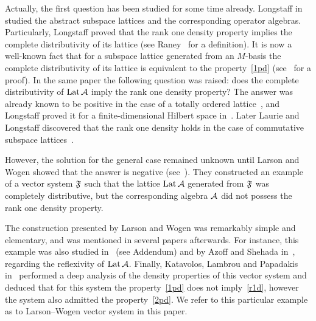 \documentclass[12pt,oneside,a4paper]{amsart}
\begin{document}
  Actually, the first question has been studied for some time already.
  Long\-staff in~\cite{longstaff} studied the abstract subspace lattices and the corresponding operator algebras.
  Particularly, Longstaff proved that the rank one density property implies
    the complete distributivity of its lattice (see Raney~\cite{raney} for a definition).
  It is now a well-known fact that for a subspace lattice generated from an $M$-basis the complete distributivity of its lattice is equivalent to
    the property~\eqref{1pd} (see~\cite{argyroslambrou} for a proof).
  In the same paper the following question was raised: does the complete distributivity of $\lattice$ imply the rank one density property?
  The answer was already known to be positive in the case of a totally ordered lattice~\cite{erdos}, and
    Longstaff proved it for a finite-dimensional Hilbert space in~\cite{longstaff}.
  Later Laurie and Longstaff discovered that the rank one density holds in the case of commutative subspace lattices~\cite{laurielongstaff}.

  However, the solution for the general case remained unknown until Larson and Wogen showed that the answer is negative (see~\cite{larson}).
  They constructed an example of a vector system $\fsys$ such that the lattice $\lattice$ generated from $\fsys$
    was completely distributive, but the corresponding algebra $\cal{A}$
    did not possess the rank one density property.
  The construction presented by Larson and Wogen was remarkably simple and elementary, and was mentioned in several papers afterwards.
  For instance, this example was also studied in~\cite{argyroslambrou} (see Addendum) and by Azoff and Shehada in~\cite{azoff}, regarding
    the reflexivity of $\lattice$.
  Finally, Katavolos, Lambrou and Papadakis in~\cite{katavolos} performed a deep analysis of the density properties
    of this vector system and deduced that for this system the property~\eqref{1pd} does not imply~\eqref{r1d},
    however the system also admitted the property~\eqref{2pd}.
  We refer to this particular example as to Larson--Wogen vector system in this paper.
\end{document}
